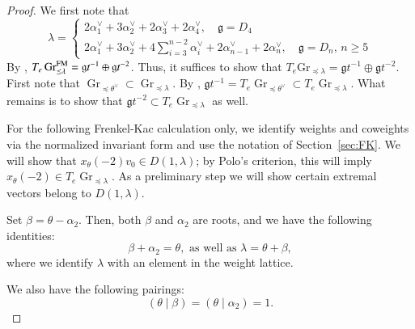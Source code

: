 \documentclass[a4paper, 12pt]{amsart}
\theoremstyle{definition}
\newcommand{\g}{\mathfrak g}
\DeclareMathOperator{\Gr}{\mathrm{Gr}}
\begin{document}
\begin{proof}
We first note that
\[
\lambda= \begin{cases}
2\alpha_1^\vee+3\alpha_2^\vee+2\alpha_3^\vee+2\alpha_4^\vee,  \quad \g=D_4\\
2\alpha_1^\vee+3\alpha_2^\vee +4\sum_{i=3}^{n-2}\alpha_i^\vee +2\alpha_{n-1}^\vee+2\alpha_n^\vee, \quad \g=D_n, \,n\geq 5
\end{cases}
\]
By \cite[Theorem 4.5]{BHY},  $  T_{e} \Gr^{\rm FM}_{\preceq \lambda} = \mathfrak{g}t^{-1} \oplus \mathfrak{g}t^{-2}$. Thus,  it suffices to show that $T_e\mathrm{Gr}_{\preceq \lambda}= \mathfrak{g}t^{-1} \oplus \mathfrak{g}t^{-2}$. First note that $\Gr_{\preceq \theta^\vee}\subset \Gr_{\preceq \lambda}$. By \cite[Proposition 3.2]{BHY}, $\g t^{-1}= T_e\Gr_{\preceq \theta^\vee}\subset  T_e\Gr_{\preceq \lambda}$. What remains is to show that $\mathfrak{g}t^{-2} \subset T_e \Gr_{\preceq \lambda}$ as well.

For the following Frenkel-Kac calculation only, we identify weights and
coweights via the normalized invariant form and use the notation of
Section~\ref{sec:FK}.
We will show that $x_{\theta}(-2)v_0 \in D(1,\lambda)$; by Polo's criterion, this will imply $x_{\theta}(-2) \in T_e \Gr_{\preceq \lambda}$. As a preliminary step we will show certain extremal vectors belong to $D(1,\lambda)$.

Set
$\beta=\theta-\alpha_2$. Then,
both $\beta$ and $\alpha_2$ are roots, and we have the following identities:
\[\beta+\alpha_2=\theta, \text{ as well as } \lambda=\theta+\beta,\]
where we identify $\lambda$ with an element in the weight lattice.

We also have the following pairings:
\[
\qquad (\theta\mid\beta)=(\theta\mid\alpha_2)=1.
\qquad
\]


\end{proof}
\end{document}
